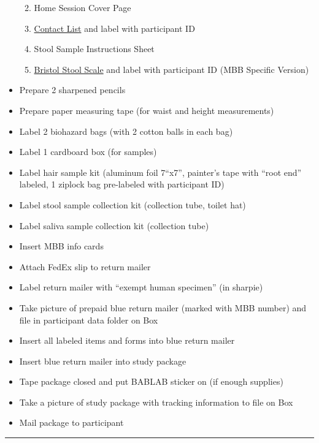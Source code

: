 \documentclass[]{book}
\providecommand{\tightlist}{%
  \setlength{\itemsep}{0pt}\setlength{\parskip}{0pt}}
\begin{document}
\begin{itemize}
  \begin{enumerate}
  \def\labelenumi{\arabic{enumi}.}
  \tightlist
  \item
    Home Session Cover Page
  \item
    \href{https://ucla.app.box.com/file/639652767665}{Contact List} and label with participant ID
  \item
    Stool Sample Instructions Sheet
  \item
    \href{https://app.box.com/file/630326499609}{Bristol Stool Scale} and label with participant ID (MBB Specific Version)
  \end{enumerate}
\item
  Prepare 2 sharpened pencils
\item
  Prepare paper measuring tape (for waist and height measurements)
\item
  Label 2 biohazard bags (with 2 cotton balls in each bag)
\item
  Label 1 cardboard box (for samples)
\item
  Label hair sample kit (aluminum foil 7``x7'', painter's tape with ``root end'' labeled, 1 ziplock bag pre-labeled with participant ID)
\item
  Label stool sample collection kit (collection tube, toilet hat)
\item
  Label saliva sample collection kit (collection tube)
\item
  Insert MBB info cards
\item
  Attach FedEx slip to return mailer
\item
  Label return mailer with ``exempt human specimen'' (in sharpie)
\item
  Take picture of prepaid blue return mailer (marked with MBB number) and file in participant data folder on Box
\item
  Insert all labeled items and forms into blue return mailer
\item
  Insert blue return mailer into study package
\item
  Tape package closed and put BABLAB sticker on (if enough supplies)
\item
  Take a picture of study package with tracking information to file on Box
\item
  Mail package to participant
\end{itemize}

\begin{center}\rule{0.5\linewidth}{0.5pt}\end{center}
\end{document}
